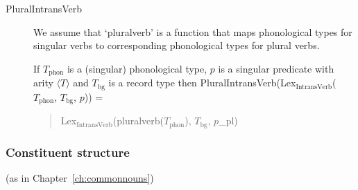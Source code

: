 \begin{description}
  
\item[\textnormal{PluralIntransVerb}] \mbox{}

  We assume that `pluralverb' is a function that maps phonological
  types for singular verbs to corresponding phonological types
  for plural verbs.

  If $T_{\text{phon}}$ is a (singular) phonological type, $p$ is a
  singular predicate with arity $\langle T\rangle$ and $T_{\text{bg}}$
  is a record type then
  PluralIntransVerb(Lex$_{\text{IntransVerb}}$($T_{\text{phon}}$,
  $T_{\text{bg}}$, $p$)) =
  \begin{quote}
    Lex$_{\text{IntransVerb}}$(pluralverb($T_{\text{phon}}$),
    $T_{\text{bg}}$, $p$\_pl)
  \end{quote} 
        

  
  
\end{description}


\subsubsection{Constituent structure} (as in Chapter~\ref{ch:commonnouns})





